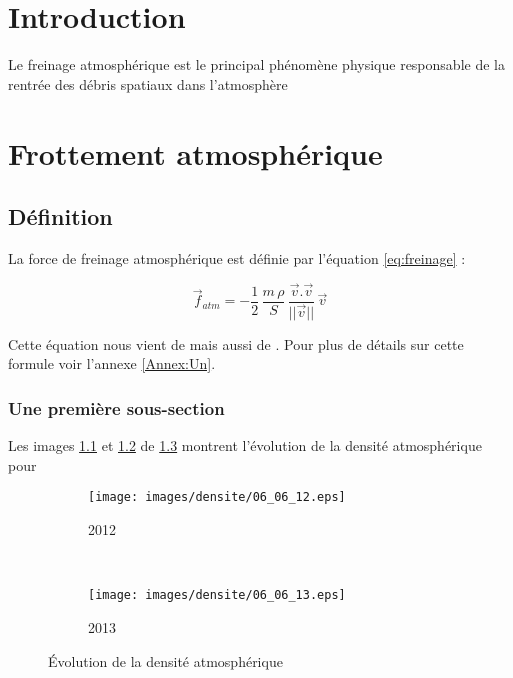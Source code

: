 \documentclass[a4paper,11pt]{report}
\begin{document}
\dominitoc

\tableofcontents

\listoffigures

\listoftables

\chapter*{Introduction}

Le freinage atmosphérique est le principal phénomène physique responsable
de la rentrée des débris spatiaux dans l'atmosphère

\chapter{Frottement atmosphérique}

\minitoc

\section{Définition}

La force de freinage atmosphérique est définie par l'équation \ref{eq:freinage} :

\begin{equation}
\overrightarrow{f}_{atm} = -\frac{1}{2} \, \frac{m \, \rho}{S} \, \frac{\overrightarrow{v}. \overrightarrow{v}}{||\overrightarrow{v}||} \, \overrightarrow{v}
\label{eq:freinage}
\end{equation}

Cette équation nous vient de \cite{king} mais aussi de \cite{deleflie}. Pour plus de détails sur cette formule voir l'annexe \ref{Annex:Un}.
\subsection{Une première sous-section}

Les images \ref{img:Stella 2012} et \ref{img:Stella 2013} de \ref{img:Densité}  montrent l'évolution de la densité atmosphérique pour 

\begin{figure}[h]
\centering
\begin{subfigure}{0.45\textwidth}
\centering
\texttt{[image: images/densite/06\_06\_12.eps]}
\caption{2012}
\label{img:Stella 2012}
\end{subfigure}
~
\begin{subfigure}{0.45\textwidth}
\centering
\texttt{[image: images/densite/06\_06\_13.eps]}
\caption{2013}
\label{img:Stella 2013}
\end{subfigure}
\caption{Évolution de la densité atmosphérique}
\label{img:Densité}
\end{figure}
\end{document}

